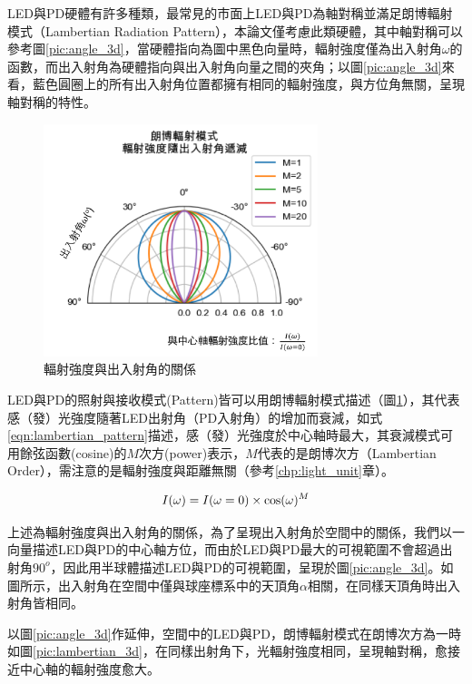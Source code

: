         LED與PD硬體有許多種類，最常見的市面上LED與PD為軸對稱並滿足朗博輻射模式（Lambertian Radiation Pattern），本論文僅考慮此類硬體，其中軸對稱可以參考圖\ref{pic:angle_3d}，當硬體指向為圖中黑色向量時，輻射強度僅為出入射角$\omega$的函數，而出入射角為硬體指向與出入射角向量之間的夾角；以圖\ref{pic:angle_3d}來看，藍色圓圈上的所有出入射角位置都擁有相同的輻射強度，與方位角無關，呈現軸對稱的特性。

        \begin{figure}[htpb]
            \centering
            \includegraphics[width=8cm]{ch2pic/lambertian.png}
            \caption{輻射強度與出入射角的關係}
            \label{pic:lambertian}
        \end{figure}

        LED與PD的照射與接收模式(Pattern)皆可以用朗博輻射模式描述（圖\ref{pic:lambertian}），其代表感（發）光強度隨著LED出射角（PD入射角）的增加而衰減，如式\ref{eqn:lambertian_pattern}描述，感（發）光強度於中心軸時最大，其衰減模式可用餘弦函數(cosine)的$M$次方(power)表示，$M$代表的是朗博次方（Lambertian Order），需注意的是輻射強度與距離無關（參考\ref{chp:light_unit}章）。

        \begin{equation}
            \label{eqn:lambertian_pattern}
            I(\omega)=I(\omega=0)\times\cos(\omega)^{M}\\
        \end{equation}


        上述為輻射強度與出入射角的關係，為了呈現出入射角於空間中的關係，我們以一向量描述LED與PD的中心軸方位，而由於LED與PD最大的可視範圍不會超過出射角$90^{o}$，因此用半球體描述LED與PD的可視範圍，呈現於圖\ref{pic:angle_3d}。如圖所示，出入射角在空間中僅與球座標系中的天頂角$\alpha$相關，在同樣天頂角時出入射角皆相同。

        以圖\ref{pic:angle_3d}作延伸，空間中的LED與PD，朗博輻射模式在朗博次方為一時如圖\ref{pic:lambertian_3d}，在同樣出射角下，光輻射強度相同，呈現軸對稱，愈接近中心軸的輻射強度愈大。


